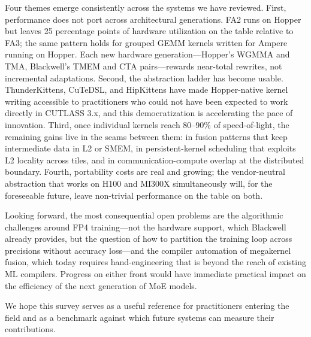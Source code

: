 \documentclass[10pt]{article}
\begin{document}
Four themes emerge consistently across the systems we have reviewed. First, performance does not port across architectural generations. FA2 runs on Hopper but leaves 25 percentage points of hardware utilization on the table relative to FA3; the same pattern holds for grouped GEMM kernels written for Ampere running on Hopper. Each new hardware generation---Hopper's WGMMA and TMA, Blackwell's TMEM and CTA pairs---rewards near-total rewrites, not incremental adaptations. Second, the abstraction ladder has become usable. ThunderKittens, CuTeDSL, and HipKittens have made Hopper-native kernel writing accessible to practitioners who could not have been expected to work directly in CUTLASS 3.x, and this democratization is accelerating the pace of innovation. Third, once individual kernels reach 80--90\% of speed-of-light, the remaining gains live in the seams between them: in fusion patterns that keep intermediate data in L2 or SMEM, in persistent-kernel scheduling that exploits L2 locality across tiles, and in communication-compute overlap at the distributed boundary. Fourth, portability costs are real and growing; the vendor-neutral abstraction that works on H100 and MI300X simultaneously will, for the foreseeable future, leave non-trivial performance on the table on both.

Looking forward, the most consequential open problems are the algorithmic challenges around FP4 training---not the hardware support, which Blackwell already provides, but the question of how to partition the training loop across precisions without accuracy loss---and the compiler automation of megakernel fusion, which today requires hand-engineering that is beyond the reach of existing ML compilers. Progress on either front would have immediate practical impact on the efficiency of the next generation of MoE models.

We hope this survey serves as a useful reference for practitioners entering the field and as a benchmark against which future systems can measure their contributions.

\end{document}
